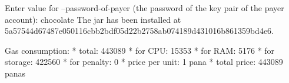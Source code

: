 \begin{shellbox}\begin{ttlst}
Enter value for --password-of-payer (the password of the key pair of the payer account): chocolate
The jar has been installed at 5a57544d67487e050116cbb2bdf05d22b2758ab074189d431016b861359bd4e6.

Gas consumption:
 * total: 443089
   * for CPU: 15353
   * for RAM: 5176
   * for storage: 422560
   * for penalty: 0
 * price per unit: 1 pana
 * total price: 443089 panas
\end{ttlst}\end{shellbox}
